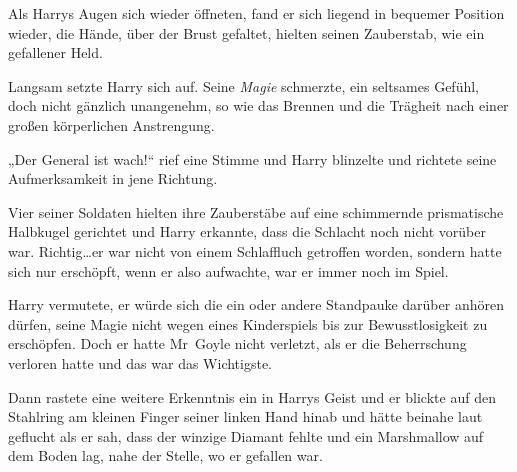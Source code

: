 \later

Als Harrys Augen sich wieder öffneten, fand er sich liegend in bequemer Position wieder, die Hände, über der Brust gefaltet, hielten seinen Zauberstab, wie ein gefallener Held.

Langsam setzte Harry sich auf. Seine \emph{Magie} schmerzte, ein seltsames Gefühl, doch nicht gänzlich unangenehm, so wie das Brennen und die Trägheit nach einer großen körperlichen Anstrengung.

„Der General ist wach!“ rief eine Stimme und Harry blinzelte und richtete seine Aufmerksamkeit in jene Richtung.

Vier seiner Soldaten hielten ihre Zauberstäbe auf eine schimmernde prismatische Halbkugel gerichtet und Harry erkannte, dass die Schlacht noch nicht vorüber war. Richtig…er war nicht von einem Schlaffluch getroffen worden, sondern hatte sich nur erschöpft, wenn er also aufwachte, war er immer noch im Spiel.

Harry vermutete, er würde sich die ein oder andere Standpauke darüber anhören dürfen, seine Magie nicht wegen eines Kinderspiels bis zur Bewusstlosigkeit zu erschöpfen. Doch er hatte Mr~Goyle nicht verletzt, als er die Beherrschung verloren hatte und das war das Wichtigste.

Dann rastete eine weitere Erkenntnis ein in Harrys Geist und er blickte auf den Stahlring am kleinen Finger seiner linken Hand hinab und hätte beinahe laut geflucht als er sah, dass der winzige Diamant fehlte und ein Marshmallow auf dem Boden lag, nahe der Stelle, wo er gefallen war.


